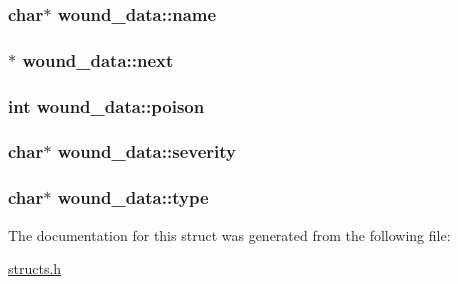 \hypertarget{structwound__data_ae70e3e3fb9e71ac3a53fc0cc57a3770c}{
\subsubsection[{name}]{\setlength{\rightskip}{0pt plus 5cm}char$\ast$ wound\-\_\-data\-::name}}\label{structwound__data_ae70e3e3fb9e71ac3a53fc0cc57a3770c}
\hypertarget{structwound__data_ae32ec87ea6c38e7cd0cf1b210005d46d}{
\subsubsection[{next}]{$\ast$ wound\-\_\-data\-::next}}\label{structwound__data_ae32ec87ea6c38e7cd0cf1b210005d46d}
\hypertarget{structwound__data_afaac7fc7d77e319662551ac5203812a4}{
\subsubsection[{poison}]{\setlength{\rightskip}{0pt plus 5cm}int wound\-\_\-data\-::poison}}\label{structwound__data_afaac7fc7d77e319662551ac5203812a4}
\hypertarget{structwound__data_aa16c2ce2d57f9e2d99d8d1de805e5610}{
\subsubsection[{severity}]{\setlength{\rightskip}{0pt plus 5cm}char$\ast$ wound\-\_\-data\-::severity}}\label{structwound__data_aa16c2ce2d57f9e2d99d8d1de805e5610}
\hypertarget{structwound__data_a4e948e084dc2302ff639487fd52efff1}{
\subsubsection[{type}]{\setlength{\rightskip}{0pt plus 5cm}char$\ast$ wound\-\_\-data\-::type}}\label{structwound__data_a4e948e084dc2302ff639487fd52efff1}


The documentation for this struct was generated from the following file\-:\begin{DoxyCompactItemize}
\item 
\hyperlink{structs_8h}{structs.\-h}\end{DoxyCompactItemize}
